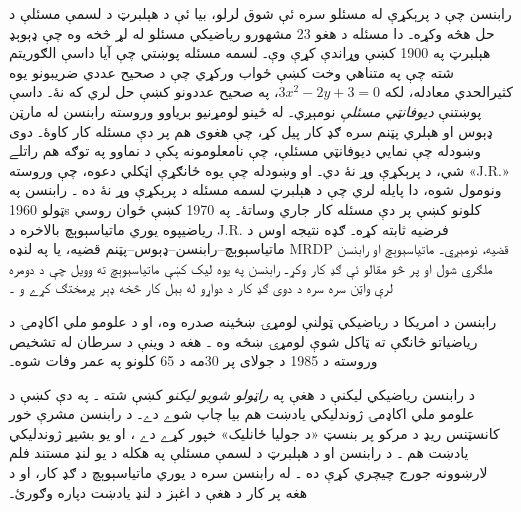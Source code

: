 \documentclass[../../../include/open-logic-section]{subfiles}
\begin{document}
رابنسن چې د پرېکړې له مسئلو سره ئې
شوق لرلو، بيا ئې د هېلبرټ د لسمې
مسئلې د حل هڅه وکړه۔ دا مسئله
د هغو 23 مشهورو رياضيکي مسئلو
له لړ څخه وه چې ډېوېډ هېلبرټ په
1900 کښې وړاندې کړې وې۔ لسمه
مسئله پوښتي چې آيا داسې الګوريتم
شته چې په متناهي وخت کښې ځواب
ورکړي چې د صحيح عددي ضريبونو
يوه کثيرالحدي معادله، لکه
$3x^2 - 2y +3 = 0$، په صحيح
عددونو کښې حل لري که نۀ۔ داسې
پوښتنې \emph{ديوفانټي مسئلې}
نومېږي۔ له ځينو لومړنيو برياوو
وروسته رابنسن له مارټن ډېوس او
هېلري پټنم سره ګډ کار پيل کړ،
چې هغوی هم پر دې مسئله کار
کاوۀ۔ دوی وښودله چې نمايي
ديوفانټي مسئلې، چې نامعلومونه
پکې د نماوو په توګه هم راتلے
شي، د پرېکړې وړ نۀ دي۔ او
وښودله چې يوه ځانګړې اټکلي
دعوه، چې وروسته «J.R.» ونومول
شوه، دا پايله لري چې د
هېلبرټ لسمه مسئله د پرېکړې
وړ نۀ ده \citep{DavisPutnamRobinson1961}۔
رابنسن په ټولو 1960s کلونو
کښې پر دې مسئله کار جاري
وساتۀ۔ په 1970 کښې ځوان
روسي رياضيپوه يوري ماتياسېوېچ
بالاخره د J.R. فرضيه ثابته
کړه۔ ګډه نتيجه اوس د
ماتياسېوېچ--رابنسن--ډېوس--پټنم
قضيه، يا په لنډه MRDP قضيه،
نومېږي۔ ماتياسېوېچ او رابنسن
ملګري شول او پر څو مقالو ئې
ګډ کار وکړ۔ رابنسن په يوه ليک کښې ماتياسېوېچ ته وويل چې د دومره لرې واټن سره سره د دوی ګډ کار د دواړو له بېل کار څخه ډېر پرمختګ کړے و \citep[45]{Matijasevich1992}۔

رابنسن د امريکا د رياضيکي ټولنې
لومړۍ ښځينه صدره وه، او د علومو ملي اکاډمۍ د رياضياتو څانګې ته ټاکل شوې لومړۍ ښځه وه \citep{Feferman1994}۔ هغه د وينې د
سرطان له تشخيص وروسته د 1985
د جولای پر 30مه د 65 کلونو
په عمر وفات شوه۔

\begin{reading}
د رابنسن رياضيکي ليکنې د هغې په
\textit{راټولو شويو ليکنو} کښې
شته \citep{Robinson1996}۔ په دې
کښې د علومو ملي اکاډمۍ ژوندليکي
يادښت \citep{Feferman1994} هم
بيا چاپ شوے دے۔ د رابنسن مشرې
خور کانسټنس ريډ د مرکو پر بنسټ
«د جوليا ځانليک» خپور کړے دے
\citep{Reid1986}، او يو بشپړ
ژوندليکي يادښت هم
\citep{Reid1996}۔ د رابنسن او
د هېلبرټ د لسمې مسئلې په هکله
د يو لنډ مستند فلم لارښوونه
جورج چيچري کړې ده
\citep{Csicsery2016}۔ له رابنسن
سره د يوري ماتياسېوېچ د ګډ
کار، او د هغه پر کار د هغې
د اغېز د لنډ يادښت دپاره
\citep{Matijasevich1992} وګورئ۔
\end{reading}
\end{document}
